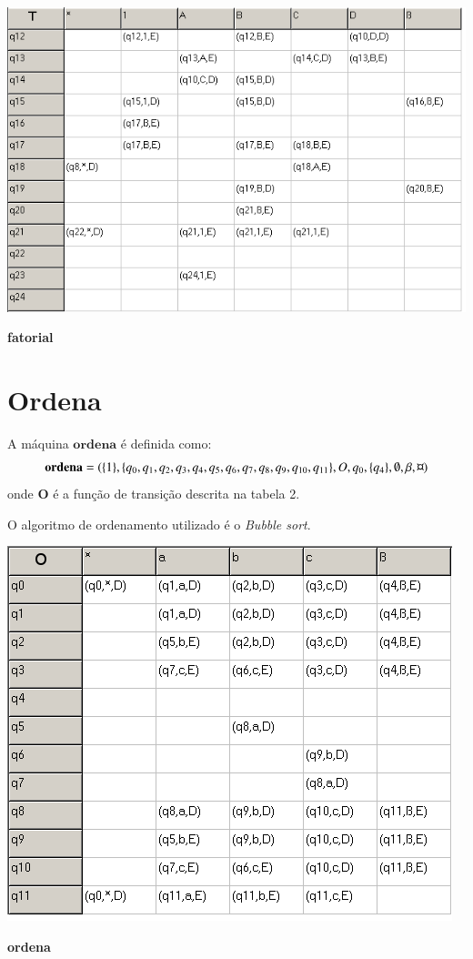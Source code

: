 \documentclass[a4paper]{article}
\begin{document}
\begin{table}[t!]
  \centering
  \includegraphics[scale=0.5]{fatorial_2.png}
  \caption{\textbf{fatorial}}
\end{table}

\section{Ordena}

A máquina $\mathbf{ordena}$ é definida como:
\begin{equation*}
\mathbf{ordena} = (\{1\}, \{q_0, q_1, q_2, q_3, q_4, q_5, q_6, q_7, q_8, q_9, q_{10}, q_{11}\}, O, q_0,
\{q_4\}, \emptyset, \beta, \text{\textcurrency} )\end{equation*} onde $\mathbf{O}$ é a função de transição descrita na tabela 2.

O algoritmo de ordenamento utilizado é o \emph{Bubble sort}.

\begin{table}[b!]
  \centering
  \includegraphics[scale=0.5]{ordena.png}
  \caption{\textbf{ordena}}
\end{table}
\end{document}
